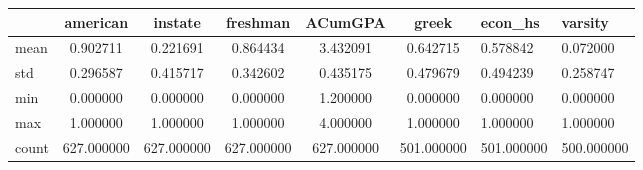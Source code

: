 \begin{tabular}{lccccc}
\toprule
{} &    american &     instate &    freshman &     ACumGPA &       greek &     econ\_hs &     varsity \\
\midrule
mean  &    0.902711 &    0.221691 &    0.864434 &    3.432091 &    0.642715 &    0.578842 &    0.072000 \\
std   &    0.296587 &    0.415717 &    0.342602 &    0.435175 &    0.479679 &    0.494239 &    0.258747 \\
min   &    0.000000 &    0.000000 &    0.000000 &    1.200000 &    0.000000 &    0.000000 &    0.000000 \\
max   &    1.000000 &    1.000000 &    1.000000 &    4.000000 &    1.000000 &    1.000000 &    1.000000 \\
count &  627.000000 &  627.000000 &  627.000000 &  627.000000 &  501.000000 &  501.000000 &  500.000000 \\
\bottomrule
\end{tabular}
